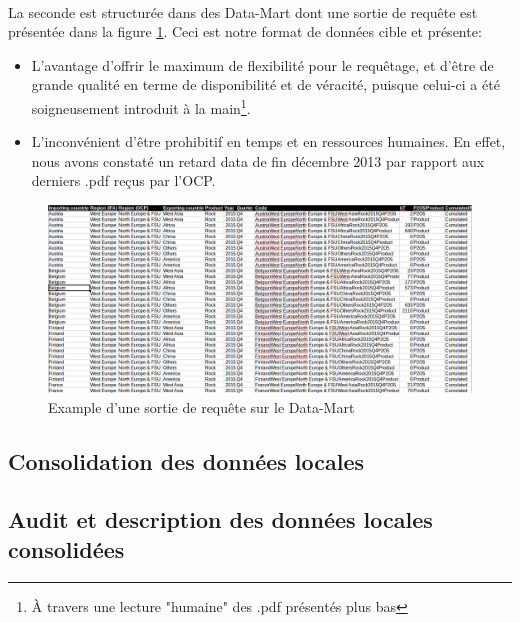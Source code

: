 		\paragraph{}
		La seconde est structurée dans des Data-Mart dont une sortie de requête est présentée dans la figure \ref{fig:DMOCP}.
	Ceci est notre format de données cible 
	et présente:
	\begin{itemize}
	\item L'avantage d’offrir le maximum de flexibilité pour le requêtage, et d'être de grande qualité en terme de disponibilité et de véracité, puisque celui-ci a été soigneusement introduit à la main\footnote{À travers une lecture "humaine" des .pdf présentés plus bas}.
	\item L’inconvénient d'être prohibitif en temps et en ressources humaines.
	 En effet, nous avons constaté un retard data de fin décembre 2013 par rapport aux derniers .pdf reçus par l'OCP.
	\end{itemize}
		 	\begin{figure}
		    		\centering
	    			\includegraphics[scale=0.35]{Table}
		    		\caption{Example d'une sortie de requête sur le Data-Mart}
		    		\label{fig:DMOCP}
		\end{figure}
	\subsection{Consolidation des données locales}
	\subsection{Audit et description des données locales consolidées}
